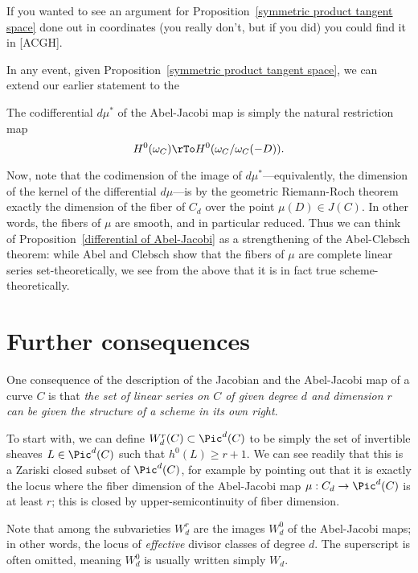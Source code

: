 
If you wanted to see an argument for Proposition~\ref{symmetric product tangent space} done out in coordinates (you really don't, but if you did) you could find it in [ACGH].

In any event, given Proposition~\ref{symmetric product tangent space}, we can extend our earlier statement to the

\begin{proposition}\label{differential of Abel-Jacobi}
The codifferential $d\mu^*$ of the Abel-Jacobi map is simply the natural restriction map
$$
H^0(\omega_C) \rTo H^0(\omega_C/\omega_C(-D)).
$$
\end{proposition}

Now, note that the codimension of the image of $d\mu^*$---equivalently, the dimension of the kernel of the differential $d\mu$---is by the geometric Riemann-Roch theorem exactly the dimension of the fiber of $C_d$ over the point $\mu(D) \in J(C)$. In other words, the fibers of $\mu$ are smooth, and in particular reduced. Thus we can think of Proposition~\ref{differential of Abel-Jacobi} as a strengthening of the Abel-Clebsch theorem: while Abel and Clebsch show that the fibers of $\mu$ are complete linear series set-theoretically, we see from the above that it is in fact true scheme-theoretically.

\section{Further consequences}

One consequence of the description of the Jacobian and the Abel-Jacobi map of a curve $C$ is that \emph{the set of linear series on $C$ of given degree $d$ and dimension $r$ can be given the structure of a scheme in its own right}.

To start with, we can define $W^r_d(C) \subset \Pic^d(C)$ to be simply the set of invertible sheaves $L \in \Pic^d(C)$ such that $h^0(L) \geq r+1$. We can see readily that this is a Zariski closed subset of $\Pic^d(C)$, for example by pointing out that it is exactly the locus where the fiber dimension of the Abel-Jacobi map $\mu : C_d \to \Pic^d(C)$ is at least $r$; this is closed by upper-semicontinuity of fiber dimension. 

Note that among the subvarieties $W^r_d$ are the images $W^0_d$ of the Abel-Jacobi maps; in other words, the locus of \emph{effective} divisor classes of degree $d$. The superscript is often omitted, meaning $W^0_d$ is usually written simply $W_d$.

